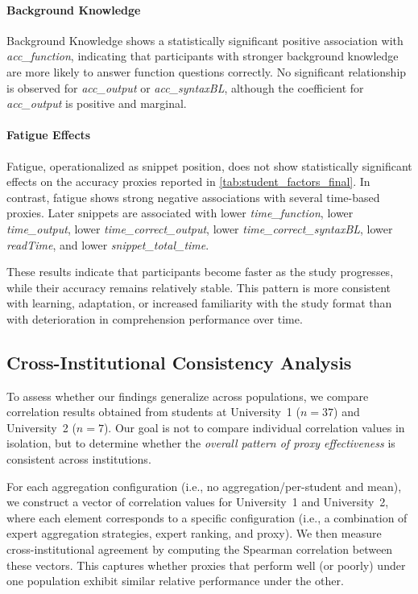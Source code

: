 \paragraph{Background Knowledge}

Background Knowledge shows a statistically significant positive association with \emph{acc\_function}, indicating that participants with stronger background knowledge are more likely to answer function questions correctly. No significant relationship is observed for \emph{acc\_output} or \emph{acc\_syntaxBL}, although the coefficient for \emph{acc\_output} is positive and marginal.

\paragraph{Fatigue Effects}

Fatigue, operationalized as snippet position, does not show statistically significant effects on the accuracy proxies reported in \cref{tab:student_factors_final}. In contrast, fatigue shows strong negative associations with several time-based proxies. Later snippets are associated with lower \emph{time\_function}, lower \emph{time\_output}, lower \emph{time\_correct\_output}, lower \emph{time\_correct\_syntaxBL}, lower \emph{readTime}, and lower \emph{snippet\_total\_time}.

These results indicate that participants become faster as the study progresses, while their accuracy remains relatively stable. This pattern is more consistent with learning, adaptation, or increased familiarity with the study format than with deterioration in comprehension performance over time.

\subsection{Cross-Institutional Consistency Analysis}
\label{app:institutions}

To assess whether our findings generalize across populations, we compare correlation results obtained from students at University~1 ($n = 37$) and University~2 ($n = 7$). Our goal is not to compare individual correlation values in isolation, but to determine whether the \emph{overall pattern of proxy effectiveness} is consistent across institutions.

For each aggregation configuration (i.e., no aggregation/per-student and mean), we construct a vector of correlation values for University~1 and University~2, where each element corresponds to a specific configuration (i.e., a combination of expert aggregation strategies, expert ranking, and proxy). We then measure cross-institutional agreement by computing the Spearman correlation between these vectors. This captures whether proxies that perform well (or poorly) under one population exhibit similar relative performance under the other.

